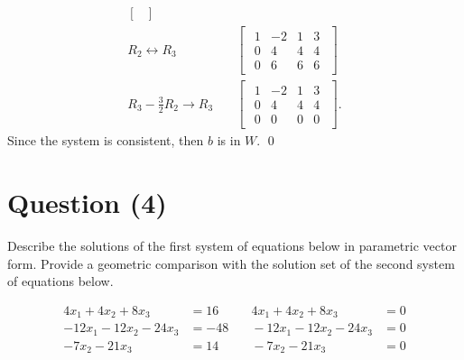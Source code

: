 \documentclass{zc-ust-hw}
\begin{document}
\begin{enumerate}
\begin{enumerate}
\begin{align}
\begin{bmatrix}
            \end{bmatrix} \\
            R_2\leftrightarrow R_3
            & \quad
            \begin{bmatrix} 
              \begin{array}{ccc|c}
                1 & -2 & 1 & 3 \\
                0 & 4 & 4 & 4 \\
                0 & 6 & 6 & 6
              \end{array}
            \end{bmatrix} \\
            R_3-\frac{3}{2}R_2\rightarrow R_3
            & \quad
            \begin{bmatrix} 
              \begin{array}{ccc|c}
                1 & -2 & 1 & 3 \\
                0 & 4 & 4 & 4 \\
                0 & 0 & 0 & 0
              \end{array}
            \end{bmatrix}
          .\end{align}
          Since the system is consistent, then $b$ is in $W$. \qed

      \end{enumerate}

  \end{enumerate}

\section*{Question (4)}

Describe the solutions of the first system of equations below in parametric
vector form. Provide a geometric comparison with the solution set of the second
system of equations below. 

\begin{equation*}\begin{array}{rlrl}
  4 x_1+4 x_2+8 x_3 & =16 & \quad 4 x_1+4 x_2+8 x_3 & =0 \\
  -12 x_1-12 x_2-24 x_3 & =-48 & \quad -12 x_1-12 x_2-24 x_3 & = 0 \\
  -7 x_2-21 x_3 & =14 & \quad -7 x_2-21 x_3 & = 0
\end{array}\end{equation*}
\end{document}
